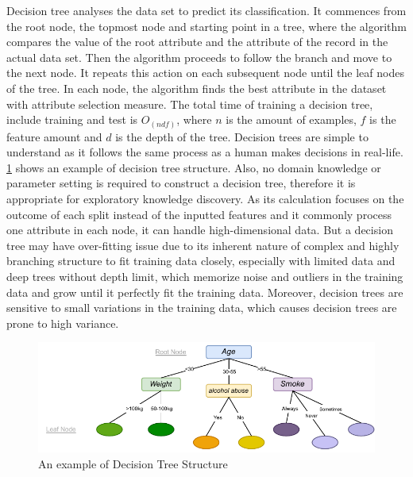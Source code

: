 \documentclass[12pt,a4paper,english
]{tunithesis}
\begin{document}
Decision tree analyses the data set to predict its classification. It commences from the root node, the topmost node and starting point in a tree, where the algorithm compares the value of the root attribute and the attribute of the record in the actual data set. Then the algorithm proceeds to follow the branch and move to the next node. It repeats this action on each subsequent node until the leaf nodes of the tree. In each node, the algorithm finds the best attribute in the dataset with attribute selection measure. The total time of training a decision tree, include training and test is ${O_{(ndf)}}$, where ${n}$ is the amount of examples, ${f}$ is the feature amount and ${d}$ is the depth of the tree. 
Decision trees are simple to understand as it follows the same process as a human makes decisions in real-life. \ref{fig:decision_tree} shows an example of decision tree structure. Also, no domain knowledge or parameter setting is required to construct a decision tree, therefore it is appropriate for exploratory knowledge discovery. As its calculation focuses on the outcome of each split instead of the inputted features and it commonly process one attribute in each node, it can handle high-dimensional data. But a decision tree may have over-fitting issue due to its inherent nature of complex and highly branching structure to fit training data closely, especially with limited data and deep trees without depth limit, which memorize noise and outliers in the training data and grow until it perfectly fit the training data. Moreover, decision trees are sensitive to small variations in the training data, which causes decision trees are prone to high variance.

\begin{figure}
  \begin{center}
    \includegraphics[width=1\textwidth]{thesis/img/decision_tree.pdf}
  \end{center}
  \caption[Decision Tree]{An example of Decision Tree Structure}
  \label{fig:decision_tree}
\end{figure}
\end{document}
